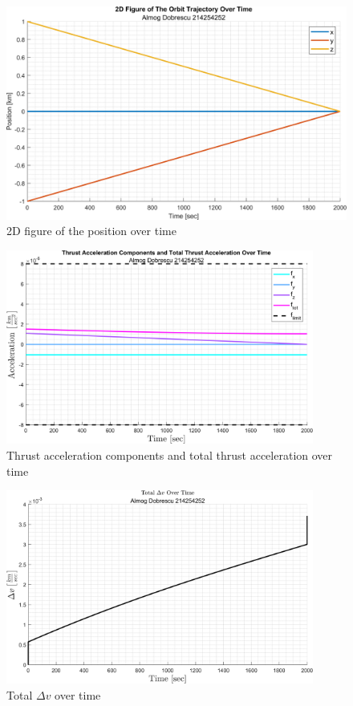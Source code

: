 \documentclass[11pt, a4paper]{article}
\begin{document}
\begin{figure}[H]
    \centering
    \includegraphics[width=1\textwidth]{images/graph2.png}
    \caption{2D figure of the position over time}
    \label{fig:2D-plot_over_time}
\end{figure}
\begin{figure}[H]
    \centering
    \includegraphics[width=0.9\textwidth]{images/graph3.png}
    \caption{Thrust acceleration components and total thrust acceleration over time}
    \label{fig:accel_over_time}
\end{figure}
\begin{figure}[H]
    \centering
    \includegraphics[width=0.9\textwidth]{images/graph4.png}
    \caption{Total $\Delta v$ over time}
    \label{fig:delta_v_over_time}
\end{figure}
\end{document}
